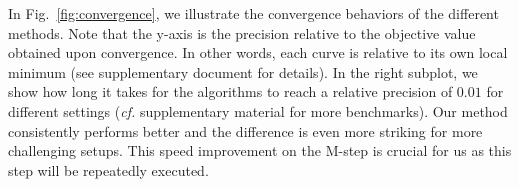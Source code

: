 In Fig.~\ref{fig:convergence}, we illustrate the convergence behaviors of the different methods.
Note that the y-axis is the precision relative to the objective value obtained upon convergence. In other words, each curve is relative to its own local minimum (see supplementary document for details).
In the right subplot, we show how long it takes for the algorithms to reach a relative precision of $0.01$ for different settings (\textit{cf.} supplementary material for more benchmarks). Our method consistently performs better and the difference is even more striking for more challenging setups. This speed improvement on the M-step is crucial for us as this step will be repeatedly executed. %
%
\newcommand{\tmpsize}{0.14}

